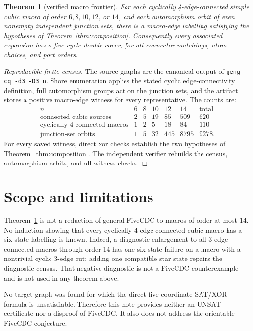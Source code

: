 \documentclass[11pt]{article}
\newtheorem{theorem}{Theorem}
\theoremstyle{definition}
\begin{document}
\begin{theorem}[verified macro frontier]\label{thm:census}
For each cyclically 4-edge-connected simple cubic macro of order
$6,8,10,12$, or $14$, and each automorphism orbit of even nonempty independent
junction sets, there is a macro-edge labelling satisfying the hypotheses of
Theorem~\ref{thm:composition}.  Consequently every associated expansion has
a five-cycle double cover, for all connector matchings, atom choices, and
port orders.
\end{theorem}

\begin{proof}[Reproducible finite census]
The source graphs are the canonical output of
\texttt{geng -cq -d3 -D3 n}.  Shore enumeration applies the stated cyclic
edge-connectivity definition, full automorphism groups act on the junction
sets, and the artifact stores a positive macro-edge witness for every
representative.  The counts are:
\[
\begin{array}{c|rrrrr|r}
n&6&8&10&12&14&\text{total}\\ \hline
\text{connected cubic sources}&2&5&19&85&509&620\\
\text{cyclically 4-connected macros}&1&2&5&18&84&110\\
\text{junction-set orbits}&1&5&32&445&8795&9278.
\end{array}
\]
For every saved witness, direct xor checks establish the two hypotheses of
Theorem~\ref{thm:composition}.  The independent verifier rebuilds the census,
automorphism orbits, and all witness checks.
\end{proof}

\section{Scope and limitations}

Theorem~\ref{thm:census} is not a reduction of general FiveCDC to macros of
order at most 14.  No induction showing that every cyclically
4-edge-connected cubic macro has a six-state labelling is known.  Indeed, a
diagnostic enlargement to all 3-edge-connected macros through order 14 has
one six-state failure on a macro with a nontrivial cyclic 3-edge cut; adding
one compatible star state repairs the diagnostic census.  That negative
diagnostic is not a FiveCDC counterexample and is not used in any theorem
above.

No target graph was found for which the direct five-coordinate SAT/XOR
formula is unsatisfiable.  Therefore this note provides neither an UNSAT
certificate nor a disproof of FiveCDC.  It also does not address the
orientable FiveCDC conjecture.
\end{document}
